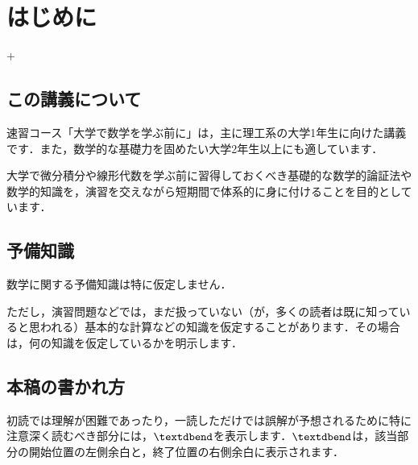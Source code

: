 \chapter*{はじめに}+
\label{chap_intro}


\section*{この講義について}

速習コース「大学で数学を学ぶ前に」は，主に理工系の大学1年生に向けた講義です．また，数学的な基礎力を固めたい大学2年生以上にも適しています．

大学で微分積分や線形代数を学ぶ前に習得しておくべき基礎的な数学的論証法や数学的知識を，演習を交えながら短期間で体系的に身に付けることを目的としています．


\section*{予備知識}

数学に関する予備知識は特に仮定しません．

ただし，演習問題などでは，まだ扱っていない（が，多くの読者は既に知っていると思われる）基本的な計算などの知識を仮定することがあります．その場合は，何の知識を仮定しているかを明示します．


\section*{本稿の書かれ方}

\begin{myenum}
  \item 初読では理解が困難であったり，一読しただけでは誤解が予想されるために特に注意深く読むべき部分には，$\textdbend$を表示します．$\textdbend$は，該当部分の開始位置の左側余白と，終了位置の右側余白に表示されます．
\end{myenum}
